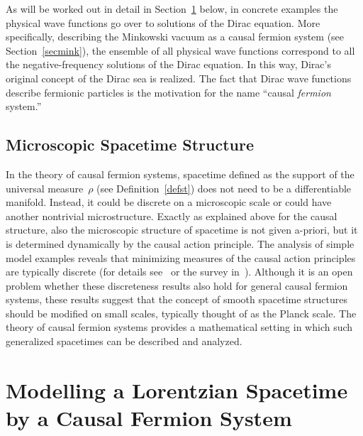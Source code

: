 \documentclass[reqno,11pt]{amsart}
\numberwithin{equation}{section}
\newcommand{\1}{\mbox{\rm 1 \hspace{-1.05 em} 1}}
\begin{document}
As will be worked out in detail in Section~\ref{secapplication} below,
in concrete examples the physical wave functions go over to solutions
of the Dirac equation. More specifically, describing the Minkowski vacuum
as a causal fermion system (see Section~\ref{secmink}), the ensemble of all physical wave functions
correspond to all the negative-frequency solutions of the Dirac equation.
In this way, Dirac's original concept of the Dirac sea is realized.
The fact that Dirac wave functions describe fermionic particles is the motivation
for the name ``causal {\em{fermion}} system.''

\subsection{Microscopic Spacetime Structure}
In the theory of causal fermion systems, spacetime defined as the support
of the universal measure~$\rho$ (see Definition~\ref{defst}) does not need to be a
differentiable manifold. Instead, it could be discrete on a microscopic scale
or could have another nontrivial microstructure.
Exactly as explained above for the causal structure, also the microscopic
structure of spacetime is not given a-priori, but it is determined dynamically by the
causal action principle. The analysis of simple model examples
reveals that minimizing measures of the causal action principles are typically
discrete (for details see~\cite{support, sphere} or the survey in~\cite[Section~3]{dice2018}).
Although it is an open problem whether these discreteness results also hold
for general causal fermion systems, these results suggest
that the concept of smooth spacetime structures
should be modified on small scales, typically thought of as the Planck scale.
The theory of causal fermion systems provides a mathematical setting in which
such generalized spacetimes can be described and analyzed.

\section{Modelling a Lorentzian Spacetime by a Causal Fermion System} \label{secapplication}
\end{document}

